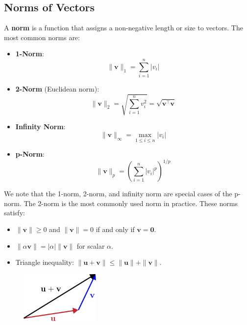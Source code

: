 \subsection{Norms of Vectors}
A \textbf{norm} is a function that assigns a non-negative length or size to vectors. The most common norms are:
\begin{itemize}
    \item \textbf{1-Norm}:
    \begin{equation*}
        \|\mathbf{v}\|_1 = \sum_{i=1}^n |v_i|
    \end{equation*}
    \item \textbf{2-Norm} (Euclidean norm):
    \begin{equation*}
        \|\mathbf{v}\|_2 = \sqrt{\sum_{i=1}^n v_i^2} = \sqrt{\mathbf{v}^\top \mathbf{v}}
    \end{equation*}
    \item \textbf{Infinity Norm}:
    \begin{equation*}
        \|\mathbf{v}\|_\infty = \max_{1 \leq i \leq n} |v_i|
    \end{equation*}
    \item \textbf{p-Norm}:
    \begin{equation*}
        \|\mathbf{v}\|_p = \left( \sum_{i=1}^n |v_i|^p \right)^{1/p}
    \end{equation*}
\end{itemize}
We note that the 1-norm, 2-norm, and infinity norm are special cases of the p-norm. The 2-norm is the most commonly used norm in practice. These norms satisfy:

\noindent
\begin{minipage}[t]{0.48\textwidth}
    \vspace{-0.4cm}
    \begin{itemize}
        \item $ \|\mathbf{v}\| \geq 0 $ and $ \|\mathbf{v}\| = 0 $ if and only if $ \mathbf{v} = \mathbf{0} $.
        \item $ \|\alpha \mathbf{v}\| = |\alpha| \|\mathbf{v}\| $ for scalar $ \alpha $.
        \item Triangle inequality: $ \|\mathbf{u} + \mathbf{v}\| \leq \|\mathbf{u}\| + \|\mathbf{v}\| $.
    \end{itemize}
\end{minipage}
\hfill
\begin{minipage}[t]{0.48\textwidth}
    \vspace{-1cm}
    \begin{figure}[H]
        \centering
        \includegraphics[width=0.35\textwidth]{figs/linear-algebra/triangle-inequality.pdf}
    \end{figure}
\end{minipage}


